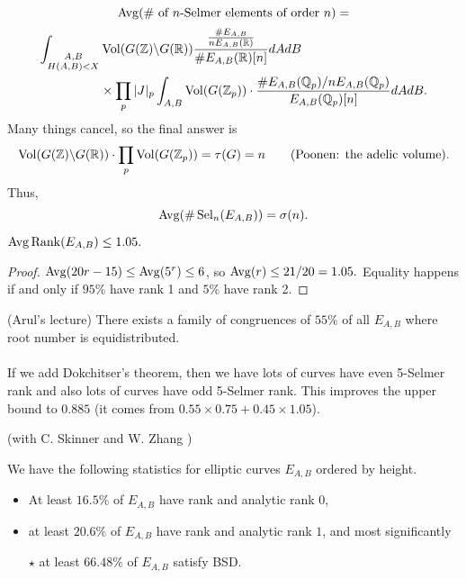 \documentclass[12pt,amsfont]{amsart}
\begin{document}
$$\displaystyle \operatorname{Avg}(\# \text{ of } n \text{-Selmer elements of order } n) = $$ 
\begin{align*}
\int_{\substack{A,B \\ H(A,B) < X}} &\operatorname{Vol}(G({\mathbb Z}) \backslash G({\mathbb R})) \frac{\frac{\# E_{A,B}}{n E_{A,B}({\mathbb R})}}{\# E_{A,B}({\mathbb R})[n]} dA dB \\
&\times\prod_p |J|_p \int_{A,B} \operatorname{Vol}(G({\mathbb Z}_p)) \cdot \frac{\# E_{A,B}({\mathbb Q}_p)/nE_{A,B}({\mathbb Q}_p)}{E_{A,B}({\mathbb Q}_p)[n]}dA dB.
\end{align*}
Many things cancel, so the final answer is
$$\displaystyle \operatorname{Vol}(G({\mathbb Z}) \backslash G({\mathbb R})) \cdot \prod_p \operatorname{Vol}(G({\mathbb Z}_p)) = \tau(G) = n \qquad\text{(Poonen: the adelic volume)}.$$
Thus,
$$\displaystyle \operatorname{Avg}(\# \operatorname{Sel}_n(E_{A,B})) = \sigma(n).$$

\begin{cor} $\operatorname{Avg} \operatorname{Rank} (E_{A,B}) \leq 1.05.$
\end{cor}

\begin{proof} $\operatorname{Avg}(20r - 15) \leq \operatorname{Avg}(5^r) \leq 6$, so $\operatorname{Avg}(r) \leq 21/20 = 1.05.$ Equality happens if and only if $95\%$ have rank 1 and $5\%$ have rank 2. 
\end{proof}

\begin{thm} (Arul's lecture) There exists a family of congruences of $55\%$ of all $E_{A,B}$ where root number is equidistributed. \\ \\
If we add Dokchitser's theorem, then we have lots of curves have even 5-Selmer rank and also lots of curves have odd 5-Selmer rank. This improves the upper bound to $0.885$ (it comes from $0.55 \times 0.75 + 0.45 \times 1.05$). 
\end{thm}

\begin{thm} (with C. Skinner and W. Zhang )
{\  }

We have the following statistics for elliptic curves $E_{A,B}$ ordered by height.
\begin{itemize}
\item
At least $16.5\%$ of $E_{A,B}$ have rank and analytic rank $0$, 
\item
at least $20.6\%$ of $E_{A,B}$ have rank and analytic rank $1$, and most significantly 
\item[$\star$] at least $66.48\%$ of $E_{A,B}$ satisfy BSD.  
\end{itemize}
\end{thm}
\renewcommand{\thesubsection}{\arabic{section}.R}
\begingroup
\renewcommand{\addcontentsline}[3]{}%
\endgroup
\end{document}
